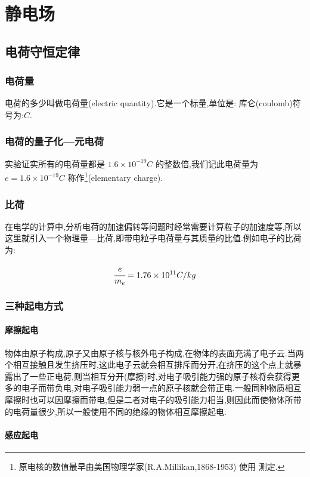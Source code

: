 \chapter{静电场}
\section{电荷守恒定律}
\subsection{电荷量}
电荷的多少叫做电荷量(electric quantity).它是一个标量,单位是: 库仑(coulomb)符号为:$C$.
\subsection{电荷的量子化---元电荷}
实验证实所有的电荷量都是 $1.6\times 10^{-19}C$ 的整数倍,我们记此电荷量为 $e=1.6\times 10^{-19}C$ 称作\footnote{
原电核的数值最早由美国物理学家(R.A.Millikan,1868-1953) 使用  测定.
}(elementary charge).

\subsection{比荷}
 在电学的计算中,分析电荷的加速偏转等问题时经常需要计算粒子的加速度等,所以这里就引入一个物理量---比荷,即带电粒子电荷量与其质量的比值.例如电子的比荷为:

 \begin{equation}
   \cfrac{e}{m_e}=1.76\times 10^{11}C/kg
 \end{equation}

 \subsection{三种起电方式}
 \subsubsection{摩擦起电}

 物体由原子构成,原子又由原子核与核外电子构成,在物体的表面充满了电子云.当两个相互接触且发生挤压时,这此电子云就会相互排斥而分开,在挤压的这个点上就暴露出了一些正电荷,则当相互分开(摩擦)时,对电子吸引能力强的原子核将会获得更多的电子而带负电,对电子吸引能力弱一点的原子核就会带正电.一般同种物质相互摩擦时也可以因摩擦而带电,但是二者对电子的吸引能力相当,则因此而使物体所带的电荷量很少,所以一般使用不同的绝缘的物体相互摩擦起电.

 \subsubsection{感应起电}

